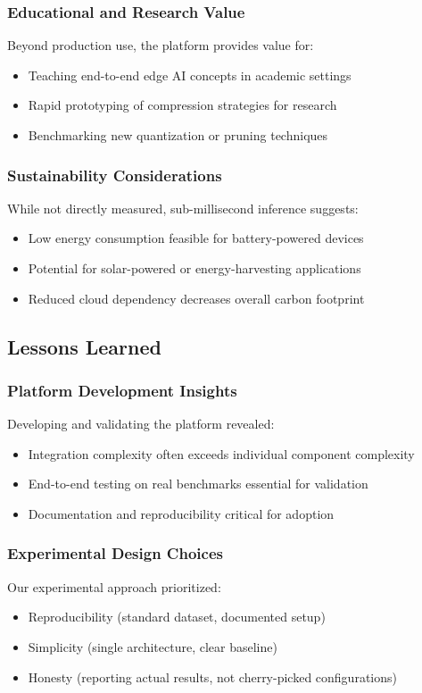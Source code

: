 \subsubsection{Educational and Research Value}
Beyond production use, the platform provides value for:
\begin{itemize}
\item Teaching end-to-end edge AI concepts in academic settings
\item Rapid prototyping of compression strategies for research
\item Benchmarking new quantization or pruning techniques
\end{itemize}

\subsubsection{Sustainability Considerations}
While not directly measured, sub-millisecond inference suggests:
\begin{itemize}
\item Low energy consumption feasible for battery-powered devices
\item Potential for solar-powered or energy-harvesting applications
\item Reduced cloud dependency decreases overall carbon footprint
\end{itemize}

\subsection{Lessons Learned}

\subsubsection{Platform Development Insights}
Developing and validating the platform revealed:
\begin{itemize}
\item Integration complexity often exceeds individual component complexity
\item End-to-end testing on real benchmarks essential for validation
\item Documentation and reproducibility critical for adoption
\end{itemize}

\subsubsection{Experimental Design Choices}
Our experimental approach prioritized:
\begin{itemize}
\item Reproducibility (standard dataset, documented setup)
\item Simplicity (single architecture, clear baseline)
\item Honesty (reporting actual results, not cherry-picked configurations)
\end{itemize}

